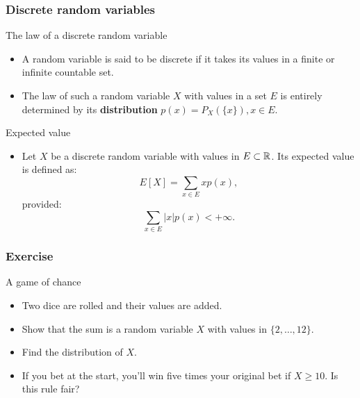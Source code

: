 \begin{frame}
    \frametitle{Discrete random variables}
\begin{block}{The law of a discrete random variable}
    \begin{itemize}
        \item<+-> A random variable is said to be discrete if it takes its 
        values in a finite or infinite countable set.
        \item<+-> The law of such a random variable $X$ with values in a set $E$ is entirely determined
        by its \textbf{distribution} $p(x) = P_X\left( \{x\} \right), x \in E.$
    \end{itemize}
\end{block}
\begin{block}{Expected value}
    \begin{itemize}
        \item<+-> Let $X$ be a discrete random variable with values in $E\subset \mathbb{R}$. 
        Its expected value is defined as:
        \begin{equation}
            E\left[ X \right] = \sum_{x \in E} x p(x),
        \end{equation}
        provided:
        \begin{equation}
            \sum_{x \in E} \lvert x \rvert p(x)< +\infty.
         \end{equation}
    \end{itemize}
\end{block}
\end{frame}
\begin{frame}
    \frametitle{Exercise}
\begin{block}{A game of chance}
    \begin{itemize}
        \item<+-> Two dice are rolled and their values are added.
        \item<+-> Show that the sum is a random variable $X$ with values in 
        $\{2, \dots, 12 \}.$
        \item<+-> Find the distribution of $X$.
        \item<+-> If you bet at the start, you'll win five times
         your original bet if $X \geq 10.$ Is this rule fair?
    \end{itemize}
\end{block}
\end{frame}

